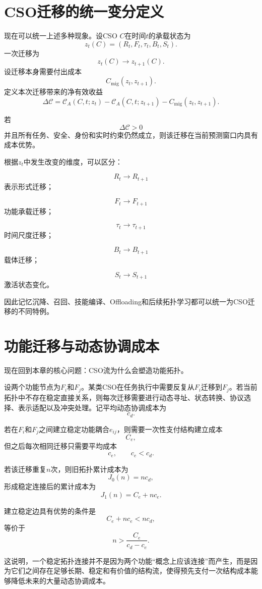 \section{CSO迁移的统一变分定义}

现在可以统一上述多种现象。设CSO $C$在时间$t$的承载状态为
\[
z_t(C)
=
(R_t,F_t,\tau_t,B_t,S_t).
\]
一次迁移为
\[
z_t(C)
\rightarrow
z_{t+1}(C).
\]
设迁移本身需要付出成本
\[
C_{\mathrm{mig}}
\left(
z_t,z_{t+1}
\right).
\]
定义本次迁移带来的净有效收益
\[
\boxed{
\Delta\mathscr C
=
\mathscr C_A(C,t;z_t)
-
\mathscr C_A(C,t;z_{t+1})
-
C_{\mathrm{mig}}(z_t,z_{t+1}).
}
\]

若
\[
\Delta\mathscr C>0
\]
并且所有任务、安全、身份和实时约束仍然成立，则该迁移在当前预测窗口内具有成本优势。

根据$z_t$中发生改变的维度，可以区分：

\[
R_t\rightarrow R_{t+1}
\]
表示形式迁移；

\[
F_t\rightarrow F_{t+1}
\]
功能承载迁移；

\[
\tau_t\rightarrow\tau_{t+1}
\]
时间尺度迁移；

\[
B_t\rightarrow B_{t+1}
\]
载体迁移；

\[
S_t\rightarrow S_{t+1}
\]
激活状态变化。

因此记忆沉降、召回、技能编译、Offloading和后续拓扑学习都可以统一为CSO迁移的不同特例。

\section{功能迁移与动态协调成本}

现在回到本章的核心问题：CSO流为什么会塑造功能拓扑。

设两个功能节点为$F_i$和$F_j$。某类CSO在任务执行中需要反复从$F_i$迁移到$F_j$。若当前拓扑中不存在稳定直接关系，则每次迁移需要进行动态寻址、状态转换、协议选择、表示适配以及冲突处理。记平均动态协调成本为
\[
c_d.
\]

若在$F_i$和$F_j$之间建立稳定功能耦合$e_{ij}$，则需要一次性支付结构建立成本
\[
C_e,
\]
但之后每次相同迁移只需要平均成本
\[
c_e,
\qquad
c_e<c_d.
\]

若该迁移重复$n$次，则旧拓扑累计成本为
\[
J_0(n)
=
nc_d,
\]
形成稳定连接后的累计成本为
\[
J_1(n)
=
C_e+nc_e.
\]

建立稳定边具有优势的条件是
\[
C_e+nc_e<nc_d,
\]
等价于
\[
\boxed{
n
>
\frac{C_e}{c_d-c_e}.
}
\]

这说明，一个稳定拓扑连接并不是因为两个功能“概念上应该连接”而产生，而是因为它们之间存在足够长期、稳定和有价值的结构流，使得预先支付一次结构成本能够降低未来的大量动态协调成本。

